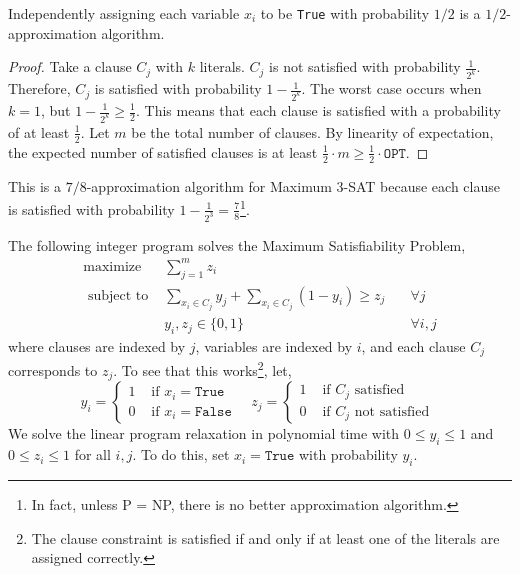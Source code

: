 \begin{thm}
	Independently assigning each variable $x_i$ to be \texttt{True} with probability $1/2$ is a $1/2$-approximation algorithm.
\end{thm}

\begin{proof}
	Take a clause $C_j$ with $k$ literals. $C_j$ is not satisfied with probability $\frac{1}{2^k}$. Therefore, $C_j$ is satisfied with probability $1 - \frac{1}{2^k}$. The worst case occurs when $k = 1$, but $1 - \frac{1}{2^k} \geq \frac{1}{2}$. This means that each clause is satisfied with a probability of at least $\frac{1}{2}$. Let $m$ be the total number of clauses. By linearity of expectation, the expected number of satisfied clauses is at least $\frac{1}{2} \cdot m \geq \frac{1}{2} \cdot \texttt{OPT}$.
\end{proof}

\begin{rmk}
	This is a $7/8$-approximation algorithm for Maximum 3-SAT because each clause is satisfied with probability $1 - \frac{1}{2^3} = \frac{7}{8}$\footnote{In fact, unless P = NP, there is no better approximation algorithm.}.
\end{rmk}

\begin{thm}
	The following integer program solves the Maximum Satisfiability Problem,
	\[
		\begin{array}{lll}
			\operatorname{maximize} & \sum_{j=1}^m z_i & \\
			\text{ subject to } & \sum_{x_i \in C_j} y_j + \sum_{x_i \in C_j} (1 - y_i) \geq z_j & \quad \forall j\\
			& y_i, z_j\in\{0,1\} & \quad \forall i, j
		\end{array}
	\]
	\noindent where clauses are indexed by $j$, variables are indexed by $i$, and each clause $C_j$ corresponds to $z_j$. To see that this works\footnote{The clause constraint is satisfied if and only if at least one of the literals are assigned correctly.}, let, 
	\[
	y_{i}=\left\{\begin{array}{ll}
	1 & \text { if } x_{i}=\texttt{True} \\
	0 & \text { if } x_{i}=\texttt{False}
	\end{array} \quad z_{j}= \begin{cases}1 & \text { if } C_{j} \text { satisfied } \\
	0 & \text { if } C_{j} \text { not satisfied }\end{cases}\right.
	\]
	\noindent We solve the linear program relaxation in polynomial time with $0 \leq y_i \leq 1$ and $0 \leq z_i \leq 1$ for all $i, j$. To do this, set $x_i = \texttt{True}$ with probability $y_i$.
\end{thm}

